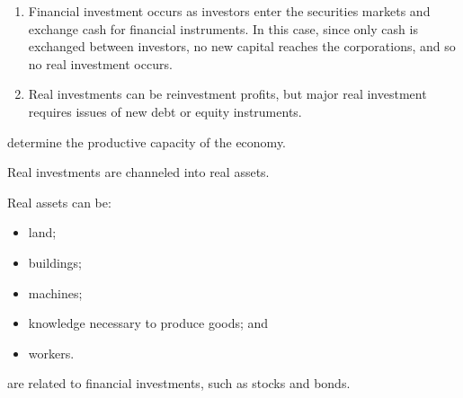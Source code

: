 \documentclass[notoc,notitlepage]{tufte-book}
\begin{document}
\begin{remark}
  \begin{enumerate}
    \item Financial investment occurs as investors enter the securities markets
      and exchange cash for financial instruments.
      In this case, since only cash is exchanged between investors,
      no new capital reaches the corporations,
      and so no real investment occurs.
    \item Real investments can be reinvestment profits,
      but major real investment requires issues of new debt or equity
      instruments.
  \end{enumerate}
\end{remark}

\begin{defn}\label{defn:real_assets}
   determine the productive capacity of the economy.
\end{defn}

\begin{remark}
  Real investments are channeled into real assets.
\end{remark}

\begin{eg}
  Real assets can be:
  \begin{itemize}
    \item land;
    \item buildings;
    \item machines;
    \item knowledge necessary to produce goods; and
    \item workers.
  \end{itemize}
\end{eg}

\begin{defn}\label{defn:financial_assets}
   are related to financial investments,
  such as stocks and bonds.
\end{defn}
\end{document}
